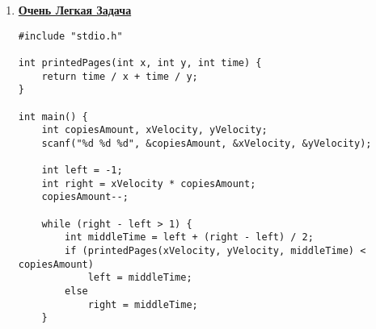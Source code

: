 \documentclass[a4paper,14pt]{extarticle}
\newcommand\codeforcesresult[1]{
    \begin{center}
        \texttt{[image: \#1]}
    \end{center}
}
\begin{document}
\begin{enumerate}
\begin{verbatim}
    qsort(array, arraySize, sizeof(array[0]), basicNumComparator);

    int requestAmount;
    scanf("%d", &requestAmount);

    for (int i = 0; i < requestAmount; i++) {
        int requestedLeftBorder, requestedRightBorder;
        scanf("%d %d", &requestedLeftBorder, &requestedRightBorder);

        int left = -1;
        int right = arraySize;

        while (right - left > 1) {
            int middleIndex = left + (right - left) / 2;
            if (array[middleIndex] < requestedLeftBorder)
                left = middleIndex;
            else
                right = middleIndex;
        }

        int leftBorder = right;
        right = arraySize;

        while (right - left > 1) {
            int middleIndex = left + (right - left) / 2;
            if (array[middleIndex] <= requestedRightBorder)
                left = middleIndex;
            else
                right = middleIndex;
        }

        printf("%d\n", right - leftBorder);
    }

    free(array);

    return 0;
}
\end{verbatim}
\codeforcesresult{/codeforceresults/283911D}
\href{https://github.com/IAmProgrammist/programming-and-algorithmization-basics/blob/c/lab10/4.c}{\underline{Ссылка на репозиторий}}

\newpage
\item \href{https://codeforces.com/edu/course/2/lesson/6/2/practice/contest/283932/problem/C}{\textbf{Очень Легкая Задача}}
\begin{verbatim}
#include "stdio.h"

int printedPages(int x, int y, int time) {
    return time / x + time / y;
}

int main() {
    int copiesAmount, xVelocity, yVelocity;
    scanf("%d %d %d", &copiesAmount, &xVelocity, &yVelocity);

    int left = -1;
    int right = xVelocity * copiesAmount;
    copiesAmount--;

    while (right - left > 1) {
        int middleTime = left + (right - left) / 2;
        if (printedPages(xVelocity, yVelocity, middleTime) < copiesAmount)
            left = middleTime;
        else
            right = middleTime;
    }


\end{verbatim}
\end{enumerate}
\end{document}
